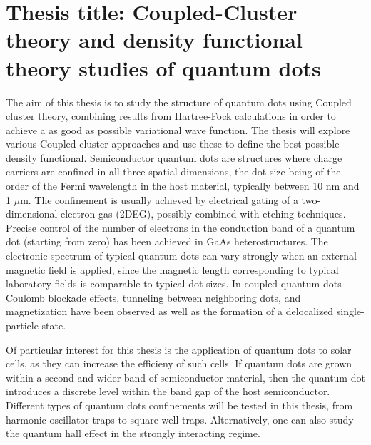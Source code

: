 \newcommand{\OP}[1]{{\bf\widehat{#1}}}

\newcommand{\be}{\begin{equation}}

\newcommand{\ee}{\end{equation}}



\pagestyle{plain}

\section*{Thesis title: Coupled-Cluster theory and density functional theory studies of quantum dots}

The aim of this thesis is to study the structure of quantum dots using
Coupled cluster theory, combining results
from Hartree-Fock calculations in order to achieve a as good as possible
variational wave function. The thesis will explore various Coupled cluster
approaches and use these to define the best possible density functional.
Semiconductor quantum dots are structures where
charge carriers are confined in all three spatial dimensions, 
the dot size being of the order of the Fermi wavelength 
in the host material, typically between  10 nm and  1 $\mu$m.
The confinement is usually achieved by electrical gating of a 
two-dimensional electron gas (2DEG), 
possibly combined with etching techniques. Precise control of the
number of electrons in the conduction band of a quantum dot 
(starting from zero) has been achieved in GaAs heterostructures. 
The electronic spectrum of typical quantum dots
can vary strongly when an external magnetic field is applied, 
since the magnetic length corresponding to typical 
laboratory fields  is comparable to typical dot sizes.
In coupled quantum dots Coulomb blockade effects, 
tunneling between neighboring dots, and magnetization 
have been observed as well as the formation of a
delocalized single-particle state. 

Of particular interest for this thesis is the application of quantum dots to solar cells, as they can increase the efficieny of such cells. If quantum dots are grown within a second and wider band of semiconductor material, then the quantum dot introduces a discrete level within the band gap of the host semiconductor.
Different types of quantum dots confinements will be tested in this thesis, from
harmonic oscillator traps to square well traps. 
Alternatively, one can also study the quantum hall effect in the strongly interacting regime.


